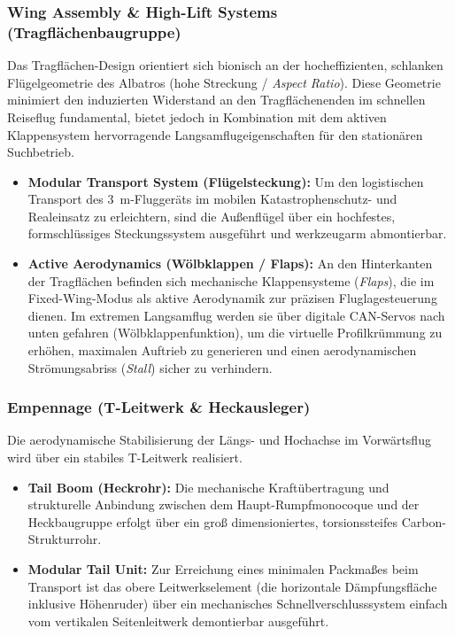 \subsubsection{Wing Assembly \& High-Lift Systems (Tragflächenbaugruppe)}
Das Tragflächen-Design orientiert sich bionisch an der hocheffizienten, schlanken Flügelgeometrie des Albatros (hohe Streckung / \textit{Aspect Ratio}). Diese Geometrie minimiert den induzierten Widerstand an den Tragflächenenden im schnellen Reiseflug fundamental, bietet jedoch in Kombination mit dem aktiven Klappensystem hervorragende Langsamflugeigenschaften für den stationären Suchbetrieb.
\begin{itemize}
    \item \textbf{Modular Transport System (Flügelsteckung):} Um den logistischen Transport des \SI{3}{\m}-Fluggeräts im mobilen Katastrophenschutz- und Realeinsatz zu erleichtern, sind die Außenflügel über ein hochfestes, formschlüssiges Steckungssystem ausgeführt und werkzeugarm abmontierbar.
    \item \textbf{Active Aerodynamics (Wölbklappen / Flaps):} An den Hinterkanten der Tragflächen befinden sich mechanische Klappensysteme (\textit{Flaps}), die im Fixed-Wing-Modus als aktive Aerodynamik zur präzisen Fluglagesteuerung dienen. Im extremen Langsamflug werden sie über digitale CAN-Servos nach unten gefahren (Wölbklappenfunktion), um die virtuelle Profilkrümmung zu erhöhen, maximalen Auftrieb zu generieren und einen aerodynamischen Strömungsabriss (\textit{Stall}) sicher zu verhindern.
\end{itemize}

\subsubsection{Empennage (T-Leitwerk \& Heckausleger)}
Die aerodynamische Stabilisierung der Längs- und Hochachse im Vorwärtsflug wird über ein stabiles T-Leitwerk realisiert.
\begin{itemize}
    \item \textbf{Tail Boom (Heckrohr):} Die mechanische Kraftübertragung und strukturelle Anbindung zwischen dem Haupt-Rumpfmonocoque und der Heckbaugruppe erfolgt über ein groß dimensioniertes, torsionssteifes Carbon-Strukturrohr.
    \item \textbf{Modular Tail Unit:} Zur Erreichung eines minimalen Packmaßes beim Transport ist das obere Leitwerkselement (die horizontale Dämpfungsfläche inklusive Höhenruder) über ein mechanisches Schnellverschlusssystem einfach vom vertikalen Seitenleitwerk demontierbar ausgeführt.
\end{itemize}

